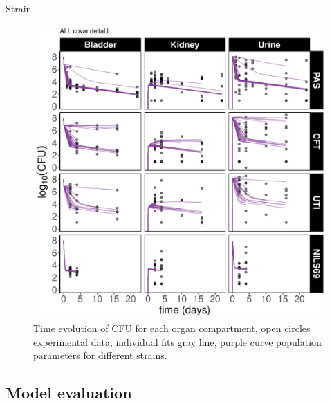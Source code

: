 \documentclass{article}
\begin{document}
Strain

\begin{figure}
	\centering
	\includegraphics[width=\linewidth]{images/plt_Ct_strain_ALL_covar_deltaU.pdf}
	\caption{Time evolution of CFU for each organ compartment, open circles experimental data, individual fits gray line, purple curve population parameters for different strains.}
	\label{fig:ModelStrainsIndFits}
\end{figure}



\subsection{Model evaluation}
\end{document}
